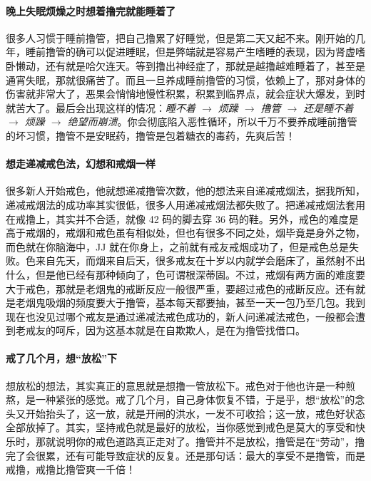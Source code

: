 \paragraph{晚上失眠烦燥之时想着撸完就能睡着了}

很多人习惯于睡前撸管，把自己撸累了好睡觉，但是第二天又起不来。刚开始的几年，睡前撸管的确可以促进睡眠，但是弊端就是容易产生嗜睡的表现，因为肾虚嗜卧懒动，还有就是哈欠连天。等到撸出神经症了，那就是越撸越难睡着了，甚至是通宵失眠，那就很痛苦了。而且一旦养成睡前撸管的习惯，依赖上了，那对身体的伤害就非常大了，恶果会悄悄地慢性积累，积累到临界点，就会症状大爆发，到时就苦大了。最后会出现这样的情况：\textit{睡不着 $\to$ 烦躁 $\to$ 撸管 $\to$ 还是睡不着 $\to$ 烦躁 $\to$ 绝望而崩溃}。你会彻底陷入恶性循环，所以千万不要养成睡前撸管的坏习惯，撸管不是安眠药，撸管是包着糖衣的毒药，先爽后苦！

\paragraph{想走递减戒色法，幻想和戒烟一样}

很多新人开始戒色，他就想递减撸管次数，他的想法来自递减戒烟法，据我所知，递减戒烟法的成功率其实很低，很多人用递减戒烟法都失败了。把递减戒烟法套用在戒撸上，其实并不合适，就像 42 码的脚去穿 36 码的鞋。另外，戒色的难度是高于戒烟的，戒烟和戒色虽有相似处，但也有很多不同之处，烟毕竟是身外之物，而色就在你脑海中，JJ 就在你身上，之前就有戒友戒烟成功了，但是戒色总是失败。色来自先天，而烟来自后天，很多戒友在十岁以内就学会磨床了，虽然射不出什么，但是他已经有那种倾向了，色可谓根深蒂固。不过，戒烟有两方面的难度要大于戒色，那就是老烟鬼的戒断反应一般很严重，要超过戒色的戒断反应。还有就是老烟鬼吸烟的频度要大于撸管，基本每天都要抽，甚至一天一包乃至几包。我到现在也没见过哪个戒友是通过递减法戒色成功的，新人问递减法戒色，一般都会遭到老戒友的呵斥，因为这基本就是在自欺欺人，是在为撸管找借口。

\paragraph{戒了几个月，想“放松”下}

想放松的想法，其实真正的意思就是想撸一管放松下。戒色对于他也许是一种煎熬，是一种紧张的感觉。戒了几个月，自己身体恢复不错，于是乎，想“放松”的念头又开始抬头了，这一放，就是开闸的洪水，一发不可收拾；这一放，戒色好状态全部放掉了。其实，坚持戒色就是最好的放松，当你感觉到戒色是莫大的享受和快乐时，那就说明你的戒色道路真正走对了。撸管并不是放松，撸管是在“劳动”，撸完了会很累，还有可能导致症状的反复。还是那句话：最大的享受不是撸管，而是戒撸，戒撸比撸管爽一千倍！

